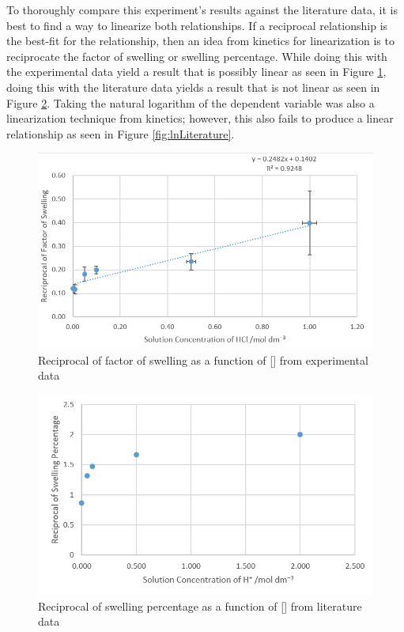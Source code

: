 \documentclass[11pt, letterpaper]{article}
\begin{document}
To thoroughly compare this experiment's results against the literature
data, it is best to find a way to linearize both relationships.
If a reciprocal relationship is the best-fit for the relationship,
then an idea from kinetics for linearization is to reciprocate
the factor of swelling or swelling percentage. While doing
this with the experimental data yield a result that is possibly
linear as seen in Figure \ref*{fig:reciprocalLinearization}, doing this with the literature data yields a result
that is not linear as seen in Figure \ref*{fig:reciprocalLiterature}.
Taking the natural logarithm of the dependent variable was also
a linearization technique from kinetics; however, this also fails
to produce a linear relationship as seen in Figure \ref*{fig:lnLiterature}.

\begin{paracol}{2}
    \begin{figure}[H]
        \centering
        \includegraphics[width=\linewidth]{reciprocalLinearization.png}
        \caption{Reciprocal of factor of swelling as a function of [] from experimental data}
        \label{fig:reciprocalLinearization}
    \end{figure}
    \switchcolumn
    \begin{figure}[H]
        \centering
        \includegraphics[width=\linewidth]{reciprocalLiterature.png}
        \caption{Reciprocal of swelling percentage as a function of [] from literature data \protect\cite{ramavaraprasadSwellingCharacteristicsSoils2018a}}
        \label{fig:reciprocalLiterature}
    \end{figure}
\end{paracol}
\end{document}
